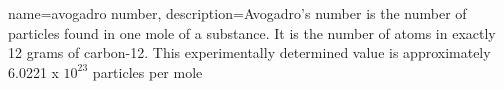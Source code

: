 {
name=avogadro number,
    description={Avogadro's number is the number of particles found in one mole of a substance. It is the number of atoms in exactly 12 grams of carbon-12. This experimentally determined value is approximately 6.0221 x $10^{23}$ particles per mole }
}
